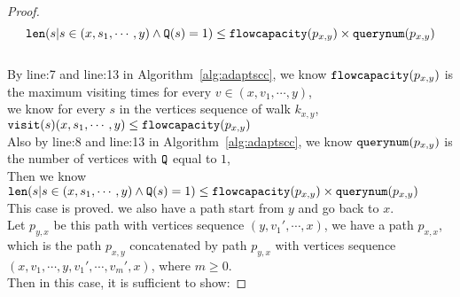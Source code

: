 \begin{proof}
  $$ 
  \mathtt{len}(s | s \in (x, s_1, \cdots, y) \land \mathtt{Q}(s) = 1) \leq \mathtt{flowcapacity}(p_{x, y}) \times \mathtt{querynum}(p_{x, y} ) 
  $$
  \\
By line:7 and line:13 in Algorithm~\ref{alg:adaptscc}, we know $\mathtt{flowcapacity}(p_{x, y})$ is the maximum visiting times for every $v \in (x, v_1, \cdots, y)$, 
\\
we know for every $s$ in the vertices sequence of walk $k_{x,y}$, 
$\mathtt{visit}(s) (x, s_1, \cdots, y)  \leq \mathtt{flowcapacity}(p_{x, y})$
  \\
  Also by line:8 and line:13 in Algorithm~\ref{alg:adaptscc}, we know $\mathtt{querynum}(p_{x, y})$ is the number of vertices with $\mathtt{Q}$ equal to $1$,
  \\
  Then we know 
  \\
  $\mathtt{len}(s | s \in (x, s_1, \cdots, y) \land \mathtt{Q}(s) = 1) \leq \mathtt{flowcapacity}(p_{x, y}) \times \mathtt{querynum}(p_{x, y}) $
  \\
  This case is proved.
  we also have a path start from $y$ and go back to $x$.
  \\
  Let $p_{y, x}$ be this path with vertices sequence $(y, v_1', \cdots, x)$, we have a path $p_{x,x}$, which is the path $p_{x, y}$ concatenated by path $p_{y, x}$ with vertices sequence $ (x, v_1, \cdots, y, v_1', \cdots, v_{m}', x)$, where $m \geq 0$.
  \\
  Then in this case, it is sufficient to show: 

\end{proof}
